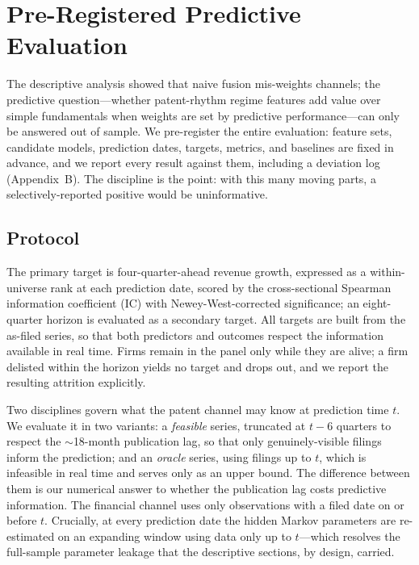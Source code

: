 \documentclass[11pt]{article}
\begin{document}
\section{Pre-Registered Predictive Evaluation}

The descriptive analysis showed that naive fusion mis-weights channels; the predictive question---whether patent-rhythm regime features add value over simple fundamentals when weights are set by predictive performance---can only be answered out of sample. We pre-register the entire evaluation: feature sets, candidate models, prediction dates, targets, metrics, and baselines are fixed in advance, and we report every result against them, including a deviation log (Appendix~B). The discipline is the point: with this many moving parts, a selectively-reported positive would be uninformative.

\subsection{Protocol}

The primary target is four-quarter-ahead revenue growth, expressed as a within-universe rank at each prediction date, scored by the cross-sectional Spearman information coefficient (IC) with Newey-West-corrected significance; an eight-quarter horizon is evaluated as a secondary target. All targets are built from the as-filed series, so that both predictors and outcomes respect the information available in real time. Firms remain in the panel only while they are alive; a firm delisted within the horizon yields no target and drops out, and we report the resulting attrition explicitly.

Two disciplines govern what the patent channel may know at prediction time $t$. We evaluate it in two variants: a \emph{feasible} series, truncated at $t-6$ quarters to respect the $\sim$18-month publication lag, so that only genuinely-visible filings inform the prediction; and an \emph{oracle} series, using filings up to $t$, which is infeasible in real time and serves only as an upper bound. The difference between them is our numerical answer to whether the publication lag costs predictive information. The financial channel uses only observations with a filed date on or before $t$. Crucially, at every prediction date the hidden Markov parameters are re-estimated on an expanding window using data only up to $t$---which resolves the full-sample parameter leakage that the descriptive sections, by design, carried.
\end{document}
